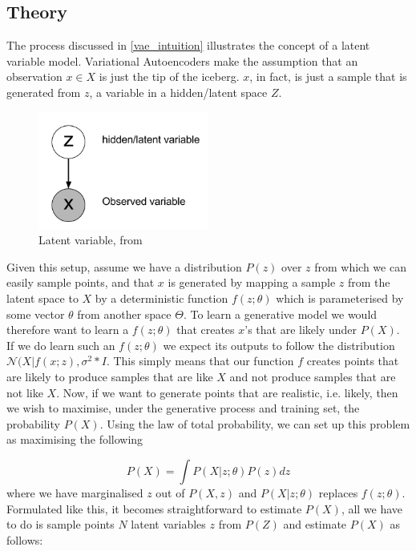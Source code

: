 \subsection{Theory} \label{vae_theory}
The process discussed in \ref{vae_intuition} illustrates the concept of a latent variable model. Variational Autoencoders make the assumption that an observation $x \in X$ is just the tip of the iceberg. $x$, in fact, is just a sample that is generated from $z$, a variable in a hidden/latent space $Z$.

 \begin{figure}[htbp]
     \centering
     \includegraphics[width=0.5\textwidth]{images/latent.png}
     \caption{Latent variable, from \citep{eric_jang}}
     \label{fig:latent}
 \end{figure}

Given this setup, assume we have a distribution $P(z)$ over $z$ from which we can easily sample points, and that $x$ is generated by mapping a sample $z$ from the latent space to $X$ by a deterministic function $f(z;\theta)$ which is parameterised by some vector $\theta$ from another space $\Theta$. To learn a generative model we would therefore want to learn a $f(z;\theta)$ that creates $x$'s that are likely under $P(X)$. If we do learn such an $f(z;\theta)$ we expect its outputs to follow the distribution $\mathcal{N}(X|f(x;z), \sigma^2 * I$. This simply means that our function $f$ creates points that are likely to produce samples that are like $X$ and not produce samples that are not like $X$. Now, if we want to generate points that are realistic, i.e. likely, then we wish to maximise, under the generative process and training set, the probability $P(X)$. Using the law of total probability, we can set up this problem as maximising the following

\begin{equation}
    P(X) = \int P(X|z;\theta)P(z)dz
\end{equation}
where we have marginalised $z$ out of $P(X,z)$ and $P(X|z; \theta)$ replaces $f(z;\theta)$. Formulated like this, it becomes straightforward to estimate $P(X)$, all we have to do is sample points $N$ latent variables $z$ from $P(Z)$ and estimate $P(X)$ as follows:

